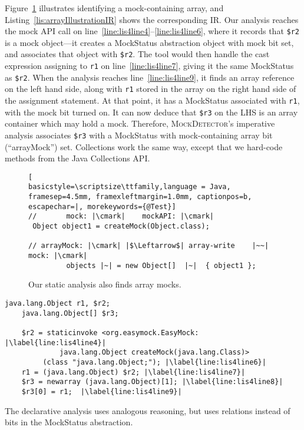 Figure~\ref{fig:arrayMockIllustration} illustrates identifying a mock-containing array, and Listing~\ref{lis:arrayIllustrationIR} shows the corresponding IR. Our analysis reaches the mock API call on line~\ref{line:lis4line4}--\ref{line:lis4line6}, where it records that \texttt{\$r2} is a mock object---it creates a MockStatus abstraction object with mock bit set, and associates that object with \texttt{\$r2}. The tool would then handle the cast expression assigning to \texttt{r1} on line~\ref{line:lis4line7}, giving it the same MockStatus as \texttt{\$r2}. When the analysis reaches line~\ref{line:lis4line9}, it finds an array reference on the left hand side, along with \texttt{r1} stored in the array on the right hand side of the assignment statement. At that point, it has a MockStatus associated with \texttt{r1}, with the mock bit turned on. It can now deduce that \texttt{\$r3} on the LHS is an array container which may hold a mock. Therefore, \textsc{MockDetector}'s imperative analysis associates \texttt{\$r3} with a MockStatus with mock-containing array bit (``arrayMock'') set. Collections work the same way, except that we hard-code methods from the Java Collections API.


\begin{figure}[h]
\begin{lstlisting}[
basicstyle=\scriptsize\ttfamily,language = Java, framesep=4.5mm, framexleftmargin=1.0mm, captionpos=b, escapechar=|, morekeywords={@Test}]
//       mock: |\cmark|    mockAPI: |\cmark|
 Object object1 = createMock(Object.class);

// arrayMock: |\cmark| |$\Leftarrow$| array-write    |~~|  mock: |\cmark|
         objects |~| = new Object[]  |~|  { object1 };
\end{lstlisting}
    
    \caption{Our static analysis also finds array mocks.}
    \label{fig:arrayMockIllustration}
    
\end{figure}

\begin{lstlisting}[basicstyle=\ttfamily, caption={Jimple Intermediate Representation for the array in Figure~\ref{fig:arrayMockIllustration}.},
basicstyle=\scriptsize\ttfamily, framesep=4.5mm, framexleftmargin=1.0mm, captionpos=b, label=lis:arrayIllustrationIR, escapechar=|, morekeywords={@Test, specialinvoke, virtualinvoke, staticinvoke, newarray}]
	java.lang.Object r1, $r2;
	java.lang.Object[] $r3;
	
	$r2 = staticinvoke <org.easymock.EasyMock: |\label{line:lis4line4}|
	         java.lang.Object createMock(java.lang.Class)>
	     (class "java.lang.Object;"); |\label{line:lis4line6}|
	r1 = (java.lang.Object) $r2; |\label{line:lis4line7}|
	$r3 = newarray (java.lang.Object)[1]; |\label{line:lis4line8}|
	$r3[0] = r1;  |\label{line:lis4line9}|
\end{lstlisting}


The declarative analysis uses analogous reasoning, but uses relations instead of bits in the MockStatus abstraction.
